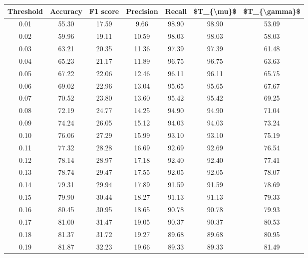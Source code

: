 \begin{tabular}{|c|c|c|c|c|c|c|}
\toprule
 Threshold &  Accuracy &  F1 score &  Precision &  Recall &  \$T\_\{\textbackslash mu\}\$ &  \$T\_\{\textbackslash gamma\}\$ \\
\hline
      0.01 &     55.30 &     17.59 &       9.66 &   98.90 &      98.90 &         53.09 \\
      0.02 &     59.96 &     19.11 &      10.59 &   98.03 &      98.03 &         58.03 \\
      0.03 &     63.21 &     20.35 &      11.36 &   97.39 &      97.39 &         61.48 \\
      0.04 &     65.23 &     21.17 &      11.89 &   96.75 &      96.75 &         63.63 \\
      0.05 &     67.22 &     22.06 &      12.46 &   96.11 &      96.11 &         65.75 \\
      0.06 &     69.02 &     22.96 &      13.04 &   95.65 &      95.65 &         67.67 \\
      0.07 &     70.52 &     23.80 &      13.60 &   95.42 &      95.42 &         69.25 \\
      0.08 &     72.19 &     24.77 &      14.25 &   94.90 &      94.90 &         71.04 \\
      0.09 &     74.24 &     26.05 &      15.12 &   94.03 &      94.03 &         73.24 \\
      0.10 &     76.06 &     27.29 &      15.99 &   93.10 &      93.10 &         75.19 \\
      0.11 &     77.32 &     28.28 &      16.69 &   92.69 &      92.69 &         76.54 \\
      0.12 &     78.14 &     28.97 &      17.18 &   92.40 &      92.40 &         77.41 \\
      0.13 &     78.74 &     29.47 &      17.55 &   92.05 &      92.05 &         78.07 \\
      0.14 &     79.31 &     29.94 &      17.89 &   91.59 &      91.59 &         78.69 \\
      0.15 &     79.90 &     30.44 &      18.27 &   91.13 &      91.13 &         79.33 \\
      0.16 &     80.45 &     30.95 &      18.65 &   90.78 &      90.78 &         79.93 \\
      0.17 &     81.00 &     31.47 &      19.05 &   90.37 &      90.37 &         80.53 \\
      0.18 &     81.37 &     31.72 &      19.27 &   89.68 &      89.68 &         80.95 \\
      0.19 &     81.87 &     32.23 &      19.66 &   89.33 &      89.33 &         81.49 \\

\end{tabular}
